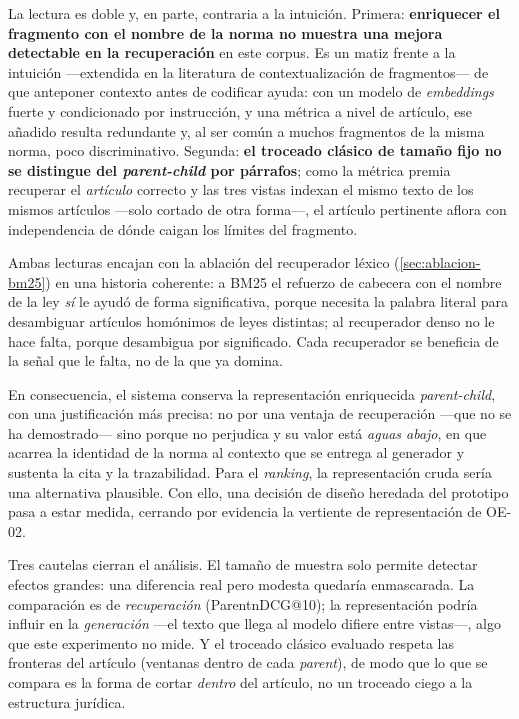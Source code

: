 La lectura es doble y, en parte, contraria a la intuición. Primera: \textbf{enriquecer el fragmento con el nombre de la norma no muestra una mejora detectable en la recuperación} en este corpus. Es un matiz frente a la intuición —extendida en la literatura de contextualización de fragmentos— de que anteponer contexto antes de codificar ayuda: con un modelo de \emph{embeddings} fuerte y condicionado por instrucción, y una métrica a nivel de artículo, ese añadido resulta redundante y, al ser común a muchos fragmentos de la misma norma, poco discriminativo. Segunda: \textbf{el troceado clásico de tamaño fijo no se distingue del \emph{parent-child} por párrafos}; como la métrica premia recuperar el \emph{artículo} correcto y las tres vistas indexan el mismo texto de los mismos artículos —solo cortado de otra forma—, el artículo pertinente aflora con independencia de dónde caigan los límites del fragmento.

Ambas lecturas encajan con la ablación del recuperador léxico (\ref{sec:ablacion-bm25}) en una historia coherente: a BM25 el refuerzo de cabecera con el nombre de la ley \emph{sí} le ayudó de forma significativa, porque necesita la palabra literal para desambiguar artículos homónimos de leyes distintas; al recuperador denso no le hace falta, porque desambigua por significado. Cada recuperador se beneficia de la señal que le falta, no de la que ya domina.

En consecuencia, el sistema conserva la representación enriquecida \emph{parent-child}, con una justificación más precisa: no por una ventaja de recuperación —que no se ha demostrado— sino porque no perjudica y su valor está \emph{aguas abajo}, en que acarrea la identidad de la norma al contexto que se entrega al generador y sustenta la cita y la trazabilidad. Para el \emph{ranking}, la representación cruda sería una alternativa plausible. Con ello, una decisión de diseño heredada del prototipo pasa a estar medida, cerrando por evidencia la vertiente de representación de OE-02.

Tres cautelas cierran el análisis. El tamaño de muestra solo permite detectar efectos grandes: una diferencia real pero modesta quedaría enmascarada. La comparación es de \emph{recuperación} (ParentnDCG@10); la representación podría influir en la \emph{generación} —el texto que llega al modelo difiere entre vistas—, algo que este experimento no mide. Y el troceado clásico evaluado respeta las fronteras del artículo (ventanas dentro de cada \emph{parent}), de modo que lo que se compara es la forma de cortar \emph{dentro} del artículo, no un troceado ciego a la estructura jurídica.

